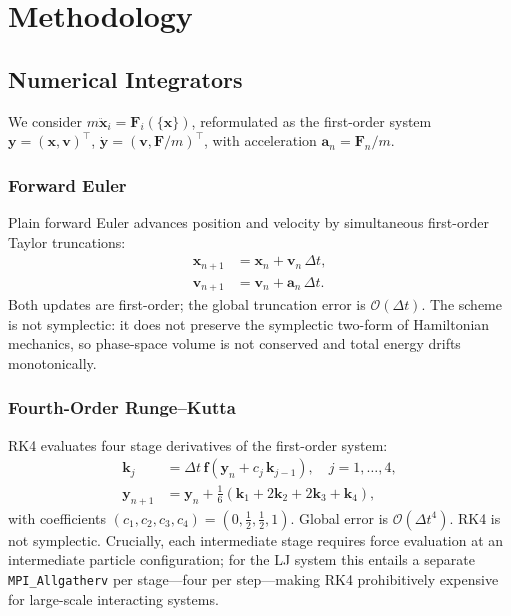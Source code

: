 \documentclass[10pt,twocolumn]{article}
\begin{document}
\section{Methodology}
\label{sec:methodology}

\subsection{Numerical Integrators}
\label{sec:integrators}

We consider $m\ddot{\mathbf{x}}_i = \mathbf{F}_i(\{\mathbf{x}\})$,
reformulated as the first-order system
$\mathbf{y}=(\mathbf{x},\mathbf{v})^\top$,
$\dot{\mathbf{y}}=(\mathbf{v},\mathbf{F}/m)^\top$,
with acceleration $\mathbf{a}_n=\mathbf{F}_n/m$.

\subsubsection{Forward Euler}

Plain forward Euler advances position and velocity by simultaneous first-order
Taylor truncations:
\begin{align}
  \mathbf{x}_{n+1} &= \mathbf{x}_n + \mathbf{v}_n\,\Delta t, \label{eq:euler_x}\\
  \mathbf{v}_{n+1} &= \mathbf{v}_n + \mathbf{a}_n\,\Delta t. \label{eq:euler_v}
\end{align}
Both updates are first-order; the global truncation error is
$\mathcal{O}(\Delta t)$. The scheme is not symplectic: it does not preserve
the symplectic two-form of Hamiltonian mechanics, so phase-space volume is
not conserved and total energy drifts monotonically.

\subsubsection{Fourth-Order Runge--Kutta}

RK4 evaluates four stage derivatives of the first-order system:
\begin{align}
  \mathbf{k}_j &= \Delta t\,\mathbf{f}\!\left(\mathbf{y}_n
    + c_j\,\mathbf{k}_{j-1}\right), \quad j=1,\ldots,4, \label{eq:rk4}\\
  \mathbf{y}_{n+1} &= \mathbf{y}_n
    + \tfrac{1}{6}(\mathbf{k}_1+2\mathbf{k}_2+2\mathbf{k}_3+\mathbf{k}_4),
    \nonumber
\end{align}
with coefficients $(c_1,c_2,c_3,c_4)=(0,\tfrac{1}{2},\tfrac{1}{2},1)$.
Global error is $\mathcal{O}(\Delta t^4)$. RK4 is not symplectic.
Crucially, each intermediate stage requires force evaluation at an
intermediate particle configuration; for the LJ system this entails a
separate \texttt{MPI\_Allgatherv} per stage---four per step---making RK4
prohibitively expensive for large-scale interacting systems.
\end{document}
